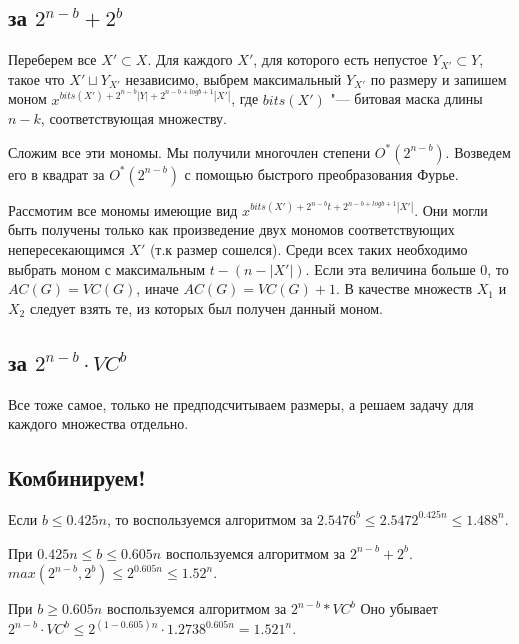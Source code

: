 \documentclass[10pt,a4paper]{article}
\begin{document}
\subsection{за $2^{n-b} + 2^b$}

Переберем все $X' \subset X$.
Для каждого $X'$, для которого есть непустое $Y_{X'} \subset Y$,
такое что $X' \sqcup Y_{X'}$ независимо, выбрем максимальный $Y_{X'}$ по размеру
и запишем моном $x^{bits(X') + 2^{n-b} |Y| + 2^{n - b + logb + 1} |X'|}$,
где $bits(X')$ "--- битовая маска длины $n-k$, соответствующая множеству.

Сложим все эти мономы. Мы получили многочлен степени $O^*(2^{n-b})$.
Возведем его в квадрат за $O^*(2^{n-b})$ с помощью
быстрого преобразования Фурье.

Рассмотим все мономы имеющие вид $x^{bits(X') + 2^{n-b}t + 2^{n - b + logb + 1} |X'|}$.
Они могли быть получены только как произведение двух мономов соответствующих
непересекающимся $X'$ (т.к размер сошелся).
Среди всех таких необходимо выбрать моном с максимальным $t - (n - |X'|)$.
Если эта величина больше 0, то $AC(G) = VC(G)$, иначе $AC(G) = VC(G)+1$.
В качестве множеств $X_1$ и $X_2$ следует взять те, из которых был получен данный моном.

\subsection{за $2^{n-b} \cdot VC^b$}

Все тоже самое, только не предподсчитываем размеры, а решаем
задачу для каждого множества отдельно.

\subsection{Комбинируем!}

Если $b \le 0.425 n$, то воспользуемся алгоритмом за 
$2.5476^b \le 2.5472^{0.425n} \le 1.488^n$.


При $0.425 n \le b \le 0.605n$ воспользуемся алгоритмом за $2^{n-b} + 2^b$.
$max(2^{n-b}, 2^b) \le 2 ^{0.605n} \le 1.52^n$.

При $b \ge 0.605n$ воспользуемся алгоритмом за $2^{n-b}* VC^b$
Оно убывает $2^{n - b} \cdot VC^b \le 2^{(1 - 0.605)n} \cdot 1.2738^{0.605n} = 1.521^n$.
\end{document}
